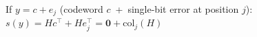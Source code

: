 \documentclass[preview]{standalone}
\begin{document}
\begin{center}
If $y = c + e_j$ \;(codeword $c$ \,+\, single-bit error at position $j$):\\[4pt]$s(y) = Hc^\top + He_j^\top = \mathbf{0} + \text{col}_j(H)$
\end{center}
\end{document}
